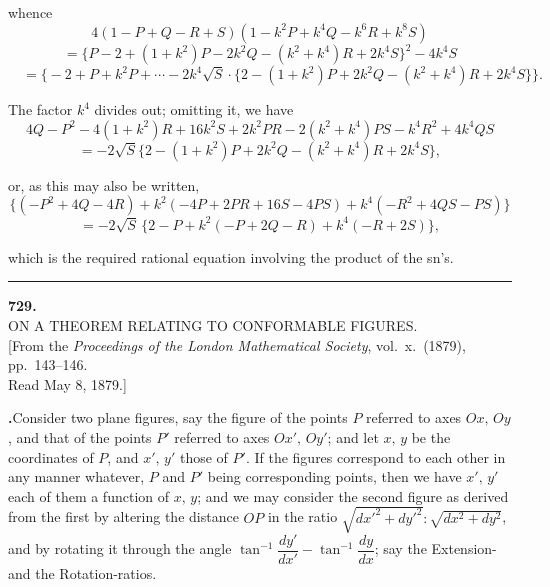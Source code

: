 \documentclass[11pt]{article}
\newcommand{\artno}[1]{\textbf{#1.}\quad}
\begin{document}
\noindent
whence
\[
4(1 - P + Q - R + S)(1 - k^2 P + k^4 Q - k^6 R + k^8 S)
\]
\[
= \bigl\{P - 2 + (1 + k^2)P - 2k^2 Q - (k^2 + k^4)R + 2k^4 S\bigr\}^2 - 4k^4 S
\]
\[
\quad = \bigl\{-2 + P + k^2 P + \cdots - 2k^4\sqrt{S}\cdot\{2 - (1 + k^2)P + 2k^2 Q - (k^2 + k^4)R + 2k^4 S\}\bigr\}.
\]

\noindent
The factor $k^4$ divides out; omitting it, we have
\[
4Q - P^2 - 4(1 + k^2)R + 16k^2 S + 2k^2 PR - 2(k^2 + k^4)PS - k^4 R^2 + 4k^4 QS
\]
\[
= -2\sqrt{S}\{2 - (1+k^2)P + 2k^2 Q - (k^2 + k^4)R + 2k^4 S\},
\]

\noindent
or, as this may also be written,
\[
\{(-P^2 + 4Q - 4R) + k^2(-4P + 2PR + 16S - 4PS) + k^4(-R^2 + 4QS - PS)\}
\]
\[
= -2\sqrt{S}\,\{2 - P + k^2(-P + 2Q - R) + k^4(-R + 2S)\},
\]

\noindent
which is the required rational equation involving the product of the sn's.

\vfill

\begin{center}\rule{0.3\textwidth}{0.4pt}\end{center}

\newpage

\begin{center}
\textbf{729.}\\[4pt]
\textsc{ON A THEOREM RELATING TO CONFORMABLE FIGURES.}\\[6pt]
\small[From the \textit{Proceedings of the London Mathematical Society}, vol.~x.\ (1879), pp.~143--146.\\
Read May 8, 1879.]
\end{center}

\bigskip

\noindent
\artno{}Consider two plane figures, say the figure of the points $P$ referred to axes
$Ox,\,Oy$, and that of the points $P'$ referred to axes $Ox',\,Oy'$; and let $x,\,y$ be the
coordinates of $P$, and $x',\,y'$ those of $P'$. If the figures correspond to each other in
any manner whatever, $P$ and $P'$ being corresponding points, then we have $x',\,y'$
each of them a function of $x,\,y$; and we may consider the second figure as derived
from the first by altering the distance $OP$ in the ratio $\sqrt{dx'^2 + dy'^2}:\sqrt{dx^2 + dy^2}$, and by
rotating it through the angle $\tan^{-1}\dfrac{dy'}{dx'} - \tan^{-1}\dfrac{dy}{dx}$; say the Extension- and
the Rotation-ratios.
\end{document}
